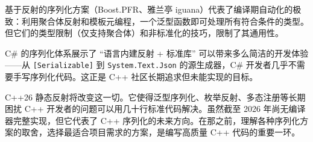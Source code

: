 \documentclass[12pt,a4paper,fontset=fandol]{ctexbook}
\newcommand{\Tp}[1]{\texttt{#1}}
\begin{document}
基于反射的序列化方案（Boost.PFR、雅兰亭 iguana）代表了编译期自动化的极致：利用聚合体反射和模板元编程，一个泛型函数即可处理所有符合条件的类型。但它们的类型限制（仅支持聚合体）和非标准化的技巧，限制了其通用性。

C\# 的序列化体系展示了 ``语言内建反射 + 标准库'' 可以带来多么简洁的开发体验——从 \texttt{[Serializable]} 到 \Tp{System.Text.Json} 的源生成器，C\# 开发者几乎不需要手写序列化代码。这正是 C++ 社区长期追求但未能实现的目标。

C++26 静态反射将改变这一切。它使得泛型序列化、枚举反射、多态注册等长期困扰 C++ 开发者的问题可以用几十行标准代码解决。虽然截至 2026 年尚无编译器完整实现，但它代表了 C++ 序列化的未来方向。在那之前，理解各种序列化方案的取舍，选择最适合项目需求的方案，是编写高质量 C++ 代码的重要一环。
\end{document}
